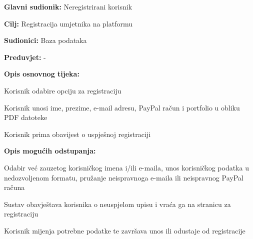 					\noindent {}
					\begin{packed_item}
						
						\item \textbf{Glavni sudionik: } Neregistrirani korisnik
						\item  \textbf{Cilj:}  Registracija umjetnika na platformu
						\item  \textbf{Sudionici:}  Baza podataka
						\item  \textbf{Preduvjet:}  -
						\item  \textbf{Opis osnovnog tijeka:}
						
						\item[] \begin{packed_enum}
							
							\item  Korisnik odabire opciju za registraciju
							\item  Korisnik unosi ime, prezime, e-mail adresu, PayPal račun i 
							portfolio u obliku PDF datoteke
							\item  Korisnik prima obavijest o uspješnoj registraciji
						\end{packed_enum}
						
						\item  \textbf{Opis mogućih odstupanja:}
						
						\item[] \begin{packed_item}
							
							\item[2.a]  Odabir već zauzetog korisničkog imena i/ili e-maila, unos korisničkog 
							podatka u nedozvoljenom formatu, pružanje neispravnoga e-maila ili neispravnog PayPal računa
							\item[] \begin{packed_enum}
								
								\item  Sustav obavještava korisnika o neuspjelom upisu i 
								vraća ga na stranicu za registraciju
								\item  Korisnik mijenja potrebne podatke te završava unos ili 
								odustaje od registracije
								
							\end{packed_enum}
							
						\end{packed_item}
					\end{packed_item}

